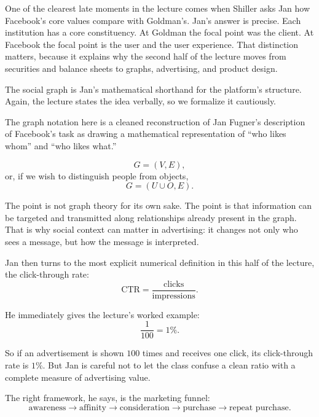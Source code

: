 One of the clearest late moments in the lecture comes when Shiller asks Jan how Facebook's core values compare with Goldman's. Jan's answer is precise. Each institution has a core constituency. At Goldman the focal point was the client. At Facebook the focal point is the user and the user experience. That distinction matters, because it explains why the second half of the lecture moves from securities and balance sheets to graphs, advertising, and product design.

The social graph is Jan's mathematical shorthand for the platform's structure. Again, the lecture states the idea verbally, so we formalize it cautiously.

\begin{remark}
The graph notation here is a cleaned reconstruction of Jan Fugner's description of Facebook's task as drawing a mathematical representation of ``who likes whom'' and ``who likes what.''
\end{remark}

\begin{equation}
G=(V,E),
\end{equation}
or, if we wish to distinguish people from objects,
\begin{equation}
G=(U\cup O,E).
\end{equation}

The point is not graph theory for its own sake. The point is that information can be targeted and transmitted along relationships already present in the graph. That is why social context can matter in advertising: it changes not only who sees a message, but how the message is interpreted.

Jan then turns to the most explicit numerical definition in this half of the lecture, the click-through rate:
\begin{equation}
\mathrm{CTR}=\frac{\text{clicks}}{\text{impressions}}.
\end{equation}

He immediately gives the lecture's worked example:
\begin{equation}
\frac{1}{100}=1\%.
\end{equation}

So if an advertisement is shown $100$ times and receives one click, its click-through rate is $1\%$. But Jan is careful not to let the class confuse a clean ratio with a complete measure of advertising value.

The right framework, he says, is the marketing funnel:
\begin{equation}
\text{awareness}\to\text{affinity}\to\text{consideration}\to\text{purchase}\to\text{repeat purchase}.
\end{equation}

